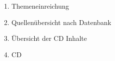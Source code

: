 
\addchap{\langanhang}
 

{\Large
\begin{enumerate}[label=\Alph*.]
	\item Themeneinreichung
	\item Quellenübersicht nach Datenbank
	\item Übersicht der CD Inhalte
	\item CD 
\end{enumerate}
}
\pagebreak

\pagebreak
